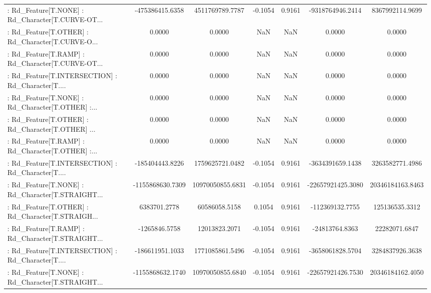 \begin{longtable}{p{4cm}cccccc}
 : Rd\_Feature[T.NONE] : Rd\_Character[T.CURVE-OT... &   -475386415.6358 &   4511769789.7787 & -0.1054 &       0.9161 &   -9318764946.2414 &   8367992114.9699 \\
 : Rd\_Feature[T.OTHER] : Rd\_Character[T.CURVE-O... &            0.0000 &            0.0000 &     NaN &          NaN &             0.0000 &            0.0000 \\
 : Rd\_Feature[T.RAMP] : Rd\_Character[T.CURVE-OT... &            0.0000 &            0.0000 &     NaN &          NaN &             0.0000 &            0.0000 \\
 : Rd\_Feature[T.INTERSECTION] : Rd\_Character[T.... &            0.0000 &            0.0000 &     NaN &          NaN &             0.0000 &            0.0000 \\
 : Rd\_Feature[T.NONE] : Rd\_Character[T.OTHER] :... &            0.0000 &            0.0000 &     NaN &          NaN &             0.0000 &            0.0000 \\
 : Rd\_Feature[T.OTHER] : Rd\_Character[T.OTHER] ... &            0.0000 &            0.0000 &     NaN &          NaN &             0.0000 &            0.0000 \\
 : Rd\_Feature[T.RAMP] : Rd\_Character[T.OTHER] :... &            0.0000 &            0.0000 &     NaN &          NaN &             0.0000 &            0.0000 \\
 : Rd\_Feature[T.INTERSECTION] : Rd\_Character[T.... &   -185404443.8226 &   1759625721.0482 & -0.1054 &       0.9161 &   -3634391659.1438 &   3263582771.4986 \\
 : Rd\_Feature[T.NONE] : Rd\_Character[T.STRAIGHT... &  -1155868630.7309 &  10970050855.6831 & -0.1054 &       0.9161 &  -22657921425.3080 &  20346184163.8463 \\
 : Rd\_Feature[T.OTHER] : Rd\_Character[T.STRAIGH... &      6383701.2778 &     60586058.5158 &  0.1054 &       0.9161 &    -112369132.7755 &    125136535.3312 \\
 : Rd\_Feature[T.RAMP] : Rd\_Character[T.STRAIGHT... &     -1265846.5758 &     12013823.2071 & -0.1054 &       0.9161 &     -24813764.8363 &     22282071.6847 \\
 : Rd\_Feature[T.INTERSECTION] : Rd\_Character[T.... &   -186611951.1033 &   1771085861.5496 & -0.1054 &       0.9161 &   -3658061828.5704 &   3284837926.3638 \\
 : Rd\_Feature[T.NONE] : Rd\_Character[T.STRAIGHT... &  -1155868632.1740 &  10970050855.6840 & -0.1054 &       0.9161 &  -22657921426.7530 &  20346184162.4050 \\

\end{longtable}
